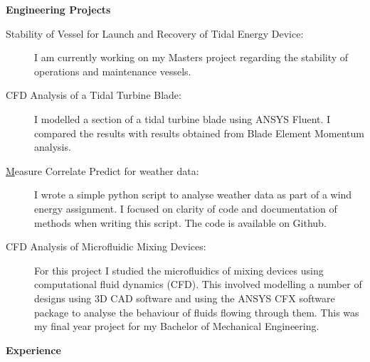 \documentclass[letterpaper,11pt]{article}
\newcommand{\resheading}[1]{{\large \colorbox{mygrey}{\begin{minipage}{\textwidth}{\textbf{#1 \vphantom{p\^{E}}}}\end{minipage}}}}
\begin{document}
\resheading{Engineering Projects}

\begin{description}
\item[Stability of Vessel for Launch and Recovery of Tidal Energy Device:] {I am currently working on my Masters project regarding the stability of operations and maintenance vessels.}

\item[CFD Analysis of a Tidal Turbine Blade:] {I modelled a section of a tidal turbine blade using ANSYS Fluent. I compared the results with results obtained from Blade Element Momentum analysis.}

\item[{\href{https://github.com/peteretep/measure-correlate-predict}Measure Correlate Predict for weather data}:] { I wrote a simple python script to analyse weather data as part of a wind energy assignment. I focused on clarity of code and documentation of methods when writing this script. The code is available on Github.}

\item[CFD Analysis of Microfluidic Mixing Devices:] { For this project I studied the microfluidics of mixing devices using computational fluid dynamics (CFD). This involved modelling a number of designs using 3D CAD software and using the ANSYS CFX software package to analyse the behaviour of fluids flowing through them. This was my final year project for my Bachelor of Mechanical Engineering. }

\end{description}

\resheading{Experience}
  
\end{document}

